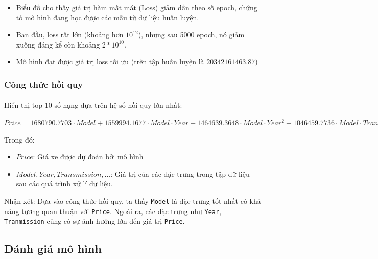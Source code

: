 \begin{itemize}
    \item Biểu đồ cho thấy giá trị hàm mất mát (Loss) giảm dần theo số epoch, chứng tỏ mô hình đang học được các mẫu từ dữ liệu huấn luyện.
    \item Ban đầu, loss rất lớn (khoảng hơn $10^{12}$), nhưng sau 5000 epoch, nó giảm xuống đáng kể còn khoảng $2 * 10^{10}$.
    \item Mô hình đạt được giá trị loss tối ưu (trên tập huấn luyện là $20342161463.87$)
\end{itemize}

\subsubsection{Công thức hồi quy}
\paragraph{}{Hiển thị top 10 số hạng dựa trên hệ số hồi quy lớn nhất:}

\begin{center}
\small $Price = 1680790.7703 \cdot Model + 1559994.1677 \cdot Model \cdot Year + 1464639.3648 \cdot Model \cdot Year^2 + 1046459.7736 \cdot Model \cdot Transmission + 1046459.7736 \cdot Model \cdot Transmission^2 + 1009863.5419 \cdot Model \cdot Kilometer + 946888.0919 \cdot Model \cdot Year \cdot Transmission + 938621.1008 \cdot Model \cdot Location + 938621.1008 \cdot Model \cdot Location^2 + 935093.6800 \cdot Model \cdot Year \cdot Kilometer + ...$
\end{center}

Trong đó:
\begin{itemize}
    \item $Price$: Giá xe được dự đoán bởi mô hình
    \item $Model, Year, Transmission, ...$: Giá trị của các đặc trưng trong tập dữ liệu sau các quá trình xử lí dữ liệu.
\end{itemize}

Nhận xét: Dựa vào công thức hồi quy, ta thấy \texttt{Model} là đặc trưng tốt nhất có khả năng tương quan thuận với \texttt{Price}. Ngoài ra, các đặc trưng như \texttt{Year}, \texttt{Tranmission} cũng có sự ảnh hưởng lớn đến giá trị \texttt{Price}.

\subsection{Đánh giá mô hình}

